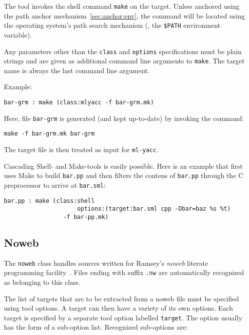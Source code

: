 The tool invokes the shell command {\tt make} on the target.  Unless
anchored using the path anchor mechanism~\ref{sec:anchor:env}, the
command will be located using the operating system's path search
mechanism (\eg{}, the {\tt \$PATH} environment variable).

Any parameters other than the {\tt class} and {\tt options}
specifications must be plain strings and are given as additional
command line arguments to {\tt make}.  The target name is always the
last command line argument.

Example:

\begin{lstlisting}[language=CM]
  bar-grm : make (class:mlyacc -f bar-grm.mk)
\end{lstlisting}%

Here, file {\tt bar-grm} is generated (and kept up-to-date) by
invoking the command:
\begin{lstlisting}[language=CM]
  make -f bar-grm.mk bar-grm
\end{lstlisting}%
\noindent The target file is then treated as input for {\tt ml-yacc}.

Cascading Shell- and Make-tools is easily possible.  Here is an
example that first uses Make to build {\tt bar.pp} and then filters
the contens of {\tt bar.pp} through the C preprocessor to arrive at
{\tt bar.sml}:

\begin{lstlisting}[language=CM]
  bar.pp : make (class:shell
                     options:(target:bar.sml cpp -Dbar=baz %s %t)
                 -f bar-pp.mk)
\end{lstlisting}%

\subsection{Noweb}
\label{sec:builtin-tools:noweb}

The {\tt noweb} class handles sources written for Ramsey's {\it noweb}
literate programming facility~\cite{ramsey:simplified}.  Files ending
with suffix {\tt .nw} are automatically recognized as belonging to
this class.

The list of targets that are to be extracted from a noweb file must be
specified using tool options.  A target can then have a variety of its
own options.  Each target is specified by a separate tool option
labelled {\tt target}.  The option usually has the form of a
sub-option list.  Recognized sub-options are:

